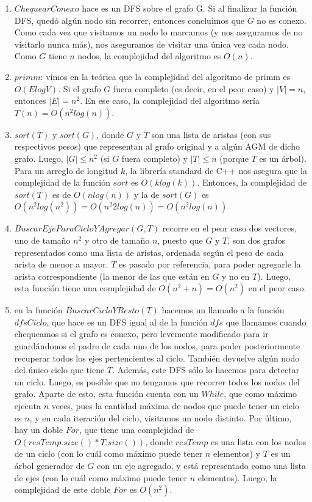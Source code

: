 \documentclass[11pt, a4paper, twoside]{article}
\begin{document}
\begin{enumerate}
	\item $ChequearConexo$ hace es un DFS sobre el grafo G. Si al finalizar la 
	      función DFS, quedó algún
	      nodo sin recorrer, entonces concluimos que $G$ no es conexo. Como cada vez que 
	      visitamos un nodo lo marcamos (y nos aseguramos de no visitarlo nunca más), nos 
	      aseguramos de visitar una única vez cada nodo. Como $G$ tiene $n$ nodos, la 
	      complejidad del algoritmo es $O(n)$.
	\item $primm$: vimos en la teórica que la complejidad del algoritmo de primm es $O(ElogV)$.
	      Si el grafo $G$ fuera completo (es decir, en el peor caso) y $|V| = n$, entonces 
	      $|E| = n^2$. En ese caso, la complejidad del algoritmo sería $T(n) = O(n^2 log(n))$. 
	\item $sort(T)$ y $sort(G)$, donde $G$ y $T$ son una lista de aristas (con sus respectivos pesos) 
	      que representan al grafo original y a algún AGM de dicho grafo. 
	      Luego, $|G| \leq n^2$ (si $G$ fuera completo) y $|T| \leq n$ (porque $T$ es un árbol).
	      Para un arreglo de longitud $k$, la librería standard de C++ nos asegura que la 
	      complejidad de la función $sort$ es $O(klog(k))$. Entonces, la complejidad de 
	      $sort(T)$ es de $O(nlog(n))$ y la de $sort(G)$ es $O(n^2 log(n^2)) = O(n^2 2log(n)) = 
	      O(n^2 log(n))$
	\item $BuscarEjeParaCicloYAgregar(G,T)$ recorre en el peor caso dos vectores, uno de tamaño
	      $n^2$ y otro de tamaño $n$, puesto que $G$ y $T$, son dos grafos representados como una lista 
	      de aristas, ordenada según el peso
          de cada arista de menor a mayor. $T$ es pasado por referencia, para poder agregarle
          la arista correspondiente (la menor de las que están en $G$ y no en $T$). Luego, esta 
          función tiene una complejidad de $O(n^2 + n) = O(n^2)$ en el peor caso.
	\item en la función $BuscarCicloYResto(T)$ hacemos un llamado a la función $dfsCiclo$, que 
	      hace es un DFS igual al de la función $dfs$ que llamamos cuando chequeamos
	      si el grafo es conexo, pero levemente modificado para ir guardándonos el padre de cada uno
	      de los nodos, para poder posteriormente recuperar todos los ejes pertencientes al ciclo. También 
	      devuelve algún nodo del único ciclo que tiene $T$. Además, este DFS sólo lo hacemos
	      para detectar un ciclo. Luego, es posible que no tengamos que recorrer todos los nodos
	      del grafo. Aparte de esto, esta función cuenta con un $While$, que como máximo ejecuta $n$ veces,
	      pues la cantidad máxima de nodos que puede tener un ciclo es $n$, y en cada iteración del ciclo,
	      visitamos un nodo distinto. Por último, hay un doble $For$, que tiene una complejidad de
	      $O(resTemp.size() * T.size())$, donde $resTemp$ es una lista con los nodos de un ciclo (con lo 
	      cuál
	      como máximo puede tener $n$ elementos) y $T$ es un árbol generador de $G$ con un eje agregado, 
	      y está representado como una lista de ejes (con lo cuál como máximo puede tener $n$ elementos). 
	      Luego,
	      la complejidad de este doble $For$ es $O(n^2)$.
	   

\end{enumerate}
\end{document}
